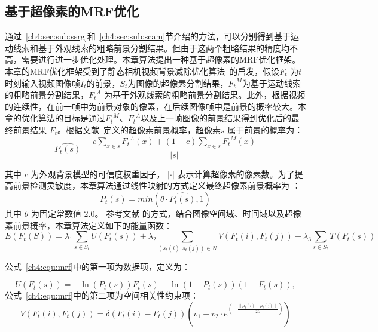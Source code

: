 \subsection{基于超像素的MRF优化}
\label {ch4:sec:MRF}

通过~\ref{ch4:sec:sub:ssrg}和~\ref{ch4:sec:sub:scam}节介绍的方法，可以分别得到基于运动线索和基于外观线索的粗略前景分割结果。但由于这两个粗略结果的精度均不高，需要进行进一步优化处理。本章算法提出一种基于超像素的MRF优化框架。本章的MRF优化框架受到了静态相机视频背景减除优化算法~\cite{MRF}的启发，假设${F}_{t}$ 为$t$ 时刻输入视频图像帧${I}_{t}$的前景，$S_{t}$为图像的超像素分割结果，${{F}_{t}}^{M}$为基于运动线索的粗略前景分割结果，${F_{t}}^{A}$ 为基于外观线索的粗略前景分割结果。此外，根据视频的连续性，在前一帧中为前景对象的像素，在后续图像帧中是前景的概率较大。本章的优化算法的目标是通过${{F}_{t}}^{M}$、${{F}_{t}}^{A}$以及上一帧图像的前景结果得到优化后的最终前景结果 $F_{t}$。根据文献~定义的超像素前景概率，超像素$s$ 属于前景的概率为：
\begin{equation}
\label{ch4:equ:fgprop}
\hat{P_{t}(s)} = \frac{c\sum_{x \in s}{F_{t}}^{A}(x) + (1-c)\sum_{x \in s}{F_{t}}^{M}(x)}{\vert s \vert}
\end{equation}



 其中 $c$ 为外观背景模型的可信度权重因子， $\vert\cdot\vert$ 表示计算超像素的像素数。为了提高前景检测灵敏度，本章算法通过线性映射的方式定义最终超像素前景概率为 ：
$$P_{t}(s) = min(\theta \cdot \hat{P_{t}(s)},1)$$
其中 $\theta$ 为固定常数值 $2.0$。 参考文献 的方式，结合图像空间域、时间域以及超像素前景概率，本章算法定义如下的能量函数：
\begin{equation}
\label{ch4:equ:mrf}
E(F_{t}(S)) = \lambda_{1}\sum_{s \in S_{t}}{U(F_{t}(s))} + \lambda_{2}\sum_{(s_{t}(i),s_{t}(j))\in N}{V(F_{t}(i),F_{t}(j))} + \lambda_{3}\sum_{s \in S_{t}}{T(F_{t}(s))}
\end{equation}



公式~\ref{ch4:equ:mrf}中的第一项为数据项，定义为：

$$ U(F_{t}(s)) = -\ln(P_{t}(s))F_{t}(s) - \ln(1-P_{t}(s))(1-F_{t}(s)), $$
公式~\ref{ch4:equ:mrf}中的第二项为空间相关性约束项：
\begin{equation}
\label{ch4:equ:mrfSpace}
V(F_{t}(i),F_{t}(j)) = \delta( F_{t}(i) - F_{t}(j)) (v_{1} + v_{2}\cdot e^{(-\frac{\parallel \mu_{t}(i) - \mu_{t}(j)\parallel}{2\beta})})
\end{equation}

